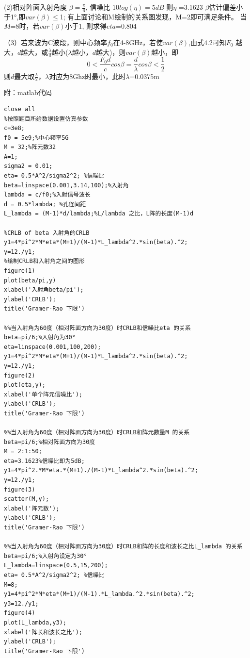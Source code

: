\documentclass{article}
\begin{document}
(2)相对阵面入射角度 $\beta=\frac{\pi}{6}$,
信噪比 $10log(\eta)=5dB$
则$\eta$ =3.1623
$\beta$估计偏差小于1°,即$var(\beta)\leq$1;
有上面讨论和M绘制的关系图发现，M=2即可满足条件。
当$M$=8时，若$var(\beta)$小于1,
则求得$eta$=0.804

（3）若来波为C波段，则中心频率$f_0$在4-8GHz，若使$var(\beta)$,由式4.2可知$F_0$
越大，$d$越大，或$\frac{\lambda}{d}$越小($\lambda$越小，$d$越大)，则$var(\beta)$越小，即
$$0<\frac{F_0d}{c}cos\beta=\frac{d}{\lambda}cos\beta<\frac{1}{2}$$
则$d$最大取$\frac{\lambda}{2}$，$\lambda$对应为8Ghz时最小，此时$\lambda$=0.0375m

附：matlab代码

\begin{lstlisting}
close all
%按照题目所给数据设置仿真参数
c=3e8;
f0 = 5e9;%中心频率5G
M = 32;%阵元数32
A=1;
sigma2 = 0.01;
eta= 0.5*A^2/sigma2^2; %信噪比
beta=linspace(0.001,3.14,100);%入射角
lambda = c/f0;%入射信号波长
d = 0.5*lambda; %孔径间距
L_lambda = (M-1)*d/lambda;%L/lambda 之比，L阵的长度(M-1)d

%CRLB of beta 入射角的CRLB 
y1=4*pi^2*M*eta*(M+1)/(M-1)*L_lambda^2.*sin(beta).^2;
y=12./y1;
%绘制CRLB和入射角之间的图形
figure(1)
plot(beta/pi,y)
xlabel('入射角beta/pi');
ylabel('CRLB');
title('Gramer-Rao 下限')

%%当入射角为60度（相对阵面方向为30度）时CRLB和信噪比eta 的关系
beta=pi/6;%入射角为30°
eta=linspace(0.001,100,200);
y1=4*pi^2*M*eta*(M+1)/(M-1)*L_lambda^2.*sin(beta).^2;
y=12./y1;
figure(2)
plot(eta,y);
xlabel('单个阵元信噪比');
ylabel('CRLB');
title('Gramer-Rao 下限')

%%当入射角为60度（相对阵面方向为30度）时CRLB和阵元数量M 的关系
beta=pi/6;%相对阵面方向为30度
M = 2:1:50;
eta=3.1623%信噪比即为5dB;
y1=4*pi^2.*M*eta.*(M+1)./(M-1)*L_lambda^2.*sin(beta).^2;
y=12./y1;
figure(3)
scatter(M,y);
xlabel('阵元数');
ylabel('CRLB');
title('Gramer-Rao 下限')

%%当入射角为60度（相对阵面方向为30度）时CRLB和阵的长度和波长之比L_lambda 的关系
beta=pi/6;%入射角设定为30°
L_lambda=linspace(0.5,15,200);
eta= 0.5*A^2/sigma2^2; %信噪比
M=8;
y1=4*pi^2*M*eta*(M+1)/(M-1).*L_lambda.^2.*sin(beta).^2;
y3=12./y1;
figure(4)
plot(L_lambda,y3);
xlabel('阵长和波长之比');
ylabel('CRLB');
title('Gramer-Rao 下限')
\end{lstlisting}
\end{document}

